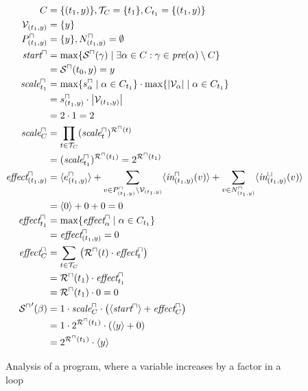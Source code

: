 \begin{figure}
\begin{align*}
  C &= \lbrace (t_1,y) \rbrace, \mathcal{T}_C = \lbrace t_1 \rbrace, C_{t_1} = \lbrace (t_1,y) \rbrace \\
  \mathcal{V}_{(t_1,y)} &= \lbrace y \rbrace \\
  P^\sqcap_{(t_1,y)} &= \lbrace y \rbrace, N^\sqcap_{(t_1,y)} = \emptyset \\
  \emph{start}^\sqcap &= \max \lbrace {\mathcal{S}^\sqcap}(\gamma) \mid \exists \alpha \in C: \gamma \in \emph{pre}(\alpha) \setminus C \rbrace \\
  &= {\mathcal{S}^\sqcap}(t_0,y) = y \\
  \emph{scale}^\sqcap_{t_1} &= \max \lbrace s^\sqcap_\alpha \mid \alpha \in C_{t_1} \rbrace \cdot \max \lbrace \left|\mathcal{V}_\alpha\right| \mid \alpha \in C_{t_1} \rbrace \\
  &= s^\sqcap_{(t_1,y)} \cdot \left|\mathcal{V}_{(t_1,y)}\right| \\
  &= 2 \cdot 1 = 2 \\
  \emph{scale}^\sqcap_C &= \prod_{t \in \mathcal{T}_C} (\emph{scale}^\sqcap_t)^{{\mathcal{R}^\sqcap}(t)} \\
  &= (\emph{scale}^\sqcap_{t_1})^{{\mathcal{R}^\sqcap}(t_1)} = 2^{{\mathcal{R}^\sqcap}(t_1)} \\
  \emph{effect}^\sqcap_{(t_1,y)} &= \langle e^{\sqcap}_{(t_1,y)}\rangle + \sum_{v \in P_{(t_1,y)}^\sqcap \setminus \mathcal{V}_{(t_1,y)}} \langle\emph{in}^\sqcap_{(t_1,y)}(v)\rangle + \sum_{v \in N_{(t_1,y)}^\sqcap} \langle\emph{in}^\sqcup_{(t_1,y)}(v)\rangle \\
  &= \langle0\rangle + 0 + 0 = 0 \\
  \emph{effect}^\sqcap_{t_1} &= \max \lbrace \emph{effect}^\sqcap_\alpha \mid \alpha \in C_{t_1}  \rbrace \\
  &= \emph{effect}^\sqcap_{(t_1,y)} = 0 \\
  \emph{effect}^\sqcap_C &= \sum_{t \in \mathcal{T}_C} \left( {\mathcal{R}^\sqcap}(t) \cdot \emph{effect}^\sqcap_t \right) \\
  &= {\mathcal{R}^\sqcap}(t_1) \cdot \emph{effect}^\sqcap_{t_1} \\
  &= {\mathcal{R}^\sqcap}(t_1) \cdot 0 = 0 \\
  {\mathcal{S}^\sqcap}'(\beta) &= 1 \cdot \emph{scale}^\sqcap_C \cdot \left( \langle\emph{start}^\sqcap\rangle + \emph{effect}^\sqcap_C \right) \\
  &= 1 \cdot 2^{{\mathcal{R}^\sqcap}(t_1)} \cdot \left( \langle y\rangle + 0 \right) \\
  &= 2^{{\mathcal{R}^\sqcap}(t_1)} \cdot \langle y\rangle
\end{align*}

\caption{Analysis of a program, where a variable increases by a factor in a loop}
\label{fig:nontrivial_nodependency}
\end{figure}
